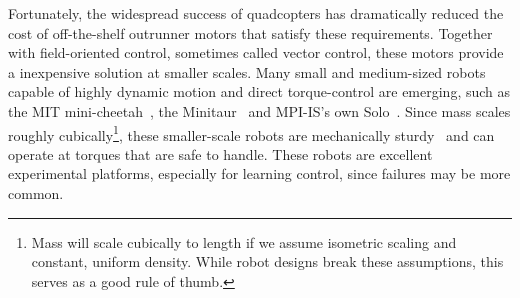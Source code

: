 Fortunately, the widespread success of quadcopters has dramatically reduced the cost of off-the-shelf outrunner motors that satisfy these requirements. Together with field-oriented control, sometimes called vector control, these motors provide a inexpensive solution at smaller scales. Many small and medium-sized robots capable of highly dynamic motion and direct torque-control are emerging, such as the MIT mini-cheetah~\cite{katz2019mini}, the Minitaur~\cite{kenneally2016design} and MPI-IS's own Solo~\cite{grimminger2019open}. Since mass scales roughly cubically\footnote{Mass will scale cubically to length if we assume isometric scaling and constant, uniform density. While robot designs break these assumptions, this serves as a good rule of thumb.}, these smaller-scale robots are mechanically sturdy~\cite{biewener2005biomechanical} and can operate at torques that are safe to handle. These robots are excellent experimental platforms, especially for learning control, since failures may be more common. \par





